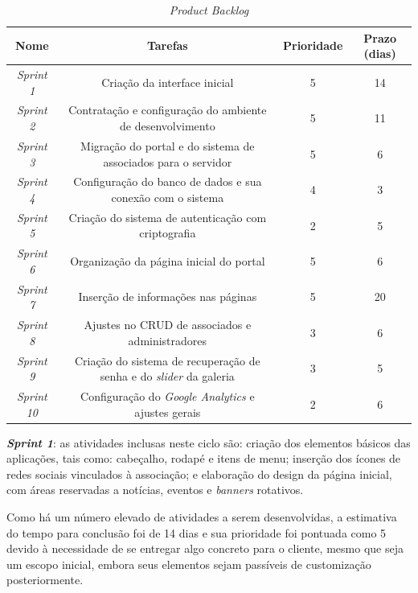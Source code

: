 \begin{table}[h]
\centering
{}
\caption{\textit{Product Backlog}}
\vspace{0.5cm}

\setlength{\extrarowheight}{0.15cm}
\begin{tabular}{c|c|c|c}
 
\textbf{Nome} & \textbf{Tarefas} & \textbf{Prioridade} & \textbf{Prazo (dias)} \\ %
\hline                               %
\textit{Sprint 1} & Criação da interface inicial & 5 & 14  \\
\textit{Sprint 2} & Contratação e configuração do ambiente de desenvolvimento & 5 & 11  \\ %
\textit{Sprint 3} & Migração do portal e do sistema de associados para o servidor & 5 & 6  \\
\textit{Sprint 4} & Configuração do banco de dados e sua conexão com o sistema & 4 & 3  \\
\textit{Sprint 5} & Criação do sistema de autenticação com criptografia & 2 & 5  \\
\textit{Sprint 6} & Organização da página inicial do portal & 5 & 6  \\
\textit{Sprint 7} & Inserção de informações nas páginas & 5 & 20  \\ %
\textit{Sprint 8} & Ajustes no CRUD de associados e administradores & 3 & 6  \\
\textit{Sprint 9} & Criação do sistema de recuperação de senha e do \textit{slider} da galeria & 3 & 5  \\
\textit{Sprint 10} & Configuração do \textit{Google Analytics} e ajustes gerais & 2 & 6 \\
\hline
\end{tabular}
\label{lista-sprints}
\end{table}

\textbf{\textit{Sprint 1}}: as atividades inclusas neste ciclo são: criação dos elementos básicos das aplicações, tais como: cabeçalho, rodapé e itens de menu; inserção dos ícones de redes sociais vinculados à associação; e elaboração do design da página inicial, com áreas reservadas a notícias, eventos e \textit{banners} rotativos.

Como há um número elevado de atividades a serem desenvolvidas, a estimativa do tempo para conclusão foi de 14 dias e sua prioridade foi pontuada como 5 devido à necessidade de se entregar algo concreto para o cliente, mesmo que seja um escopo inicial, embora seus elementos sejam passíveis de customização posteriormente. 

